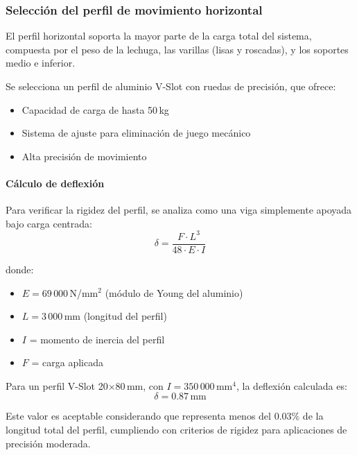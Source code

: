 \subsubsection{Selección del perfil de movimiento horizontal}
El perfil horizontal soporta la mayor parte de la carga total del sistema, compuesta por el peso de la lechuga, las varillas (lisas y roscadas), y los soportes medio e inferior.

Se selecciona un perfil de aluminio V-Slot con ruedas de precisión, que ofrece:
\begin{itemize}
    \item Capacidad de carga de hasta 50\,kg
    \item Sistema de ajuste para eliminación de juego mecánico
    \item Alta precisión de movimiento
\end{itemize}

\paragraph{Cálculo de deflexión}
Para verificar la rigidez del perfil, se analiza como una viga simplemente apoyada bajo carga centrada:
\begin{equation}
\delta = \frac{F \cdot L^3}{48 \cdot E \cdot I}
\label{eq:deflexion_perfil}
\end{equation}

donde:
\begin{itemize}
    \item $E = 69\,000$\,N/mm$^2$ (módulo de Young del aluminio)
    \item $L = 3\,000$\,mm (longitud del perfil)
    \item $I$ = momento de inercia del perfil
    \item $F$ = carga aplicada
\end{itemize}

Para un perfil V-Slot 20$\times$80\,mm, con $I = 350\,000$\,mm$^4$, la deflexión calculada es:
\[\delta = 0.87\,\text{mm}\]

Este valor es aceptable considerando que representa menos del 0.03\% de la longitud total del perfil, cumpliendo con criterios de rigidez para aplicaciones de precisión moderada.

